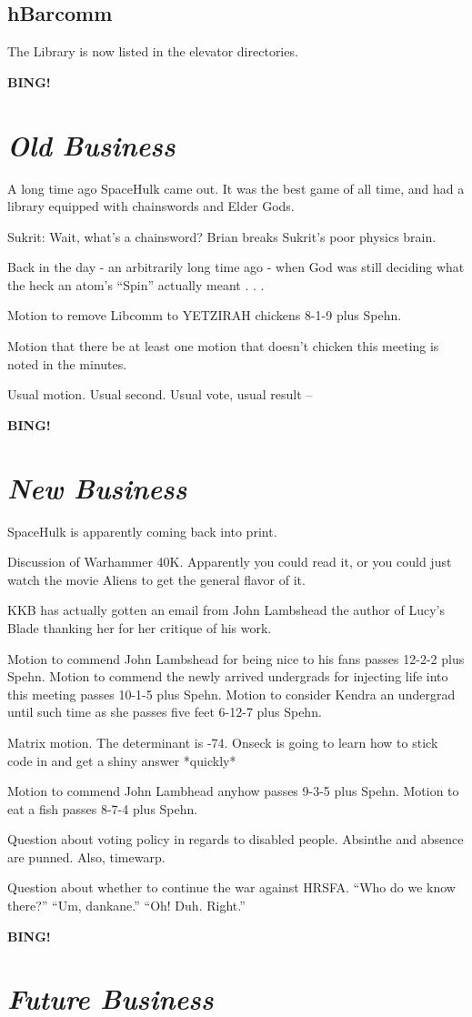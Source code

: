 \documentclass[10pt]{article}
\newcommand{\bing}{{\bf BING!} }
\newcommand{\goto}[1]{\bing \vskip 12pt \section*{{\em{#1}}}}
\newcommand{\ps}{ plus Spehn\xspace}
\begin{document}
\subsection*{hBarcomm}
The Library is now listed in the elevator directories.

\goto{Old Business}

A long time ago SpaceHulk came out. It was the best game of all time, and had a library equipped with chainswords and Elder Gods.

Sukrit: Wait, what's a chainsword?
Brian breaks Sukrit's poor physics brain.

Back in the day - an arbitrarily long time ago - when God was still deciding what the heck an atom's ``Spin'' actually meant . . .

Motion to remove Libcomm to YETZIRAH chickens 8-1-9\ps.

Motion that there be at least one motion that doesn't chicken this meeting is noted in the minutes.

Usual motion. Usual second. Usual vote, usual result -- 

\goto{New Business}

SpaceHulk is apparently coming back into print.

Discussion of Warhammer 40K. Apparently you could read it, or you could just watch the movie Aliens to get the general flavor of it.

KKB has actually gotten an email from John Lambshead the author of Lucy's Blade thanking her for her critique of his work.


Motion to commend John Lambshead for being nice to his fans passes 12-2-2\ps.
Motion to commend the newly arrived undergrads for injecting life into this meeting passes 10-1-5\ps.
Motion to consider Kendra an undergrad until such time as she passes five feet 6-12-7\ps.

Matrix motion. The determinant is -74. Onseck is going to learn how to stick code in and get a shiny answer *quickly* 

Motion to commend John Lambhead anyhow passes 9-3-5\ps. 
Motion to eat a fish passes 8-7-4\ps.

Question about voting policy in regards to disabled people. Absinthe and absence are punned. Also, timewarp.

Question about whether to continue the war against HRSFA. ``Who do we know there?'' ``Um, dankane.'' ``Oh! Duh. Right.''

\goto{Future Business}
\end{document}
